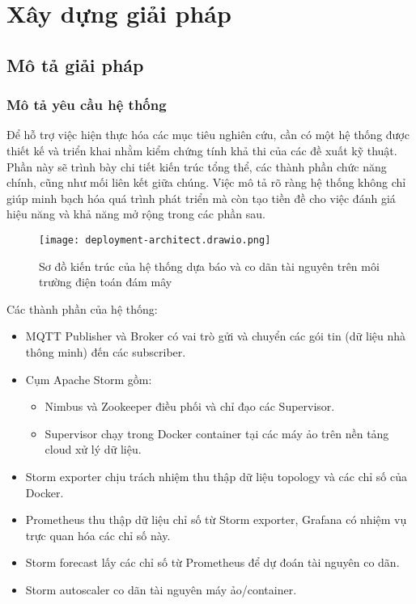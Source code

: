 \chapter{Xây dựng giải pháp \tenKL}

\section{Mô tả giải pháp}

\subsection{Mô tả yêu cầu hệ thống}

Để hỗ trợ việc hiện thực hóa các mục tiêu nghiên cứu, cần có một hệ thống được thiết kế và triển khai nhằm kiểm chứng tính khả thi của các đề xuất kỹ thuật. Phần này sẽ trình bày chi tiết kiến trúc tổng thể, các thành phần chức năng chính, cũng như mối liên kết giữa chúng. Việc mô tả rõ ràng hệ thống không chỉ giúp minh bạch hóa quá trình phát triển mà còn tạo tiền đề cho việc đánh giá hiệu năng và khả năng mở rộng trong các phần sau.

\begin{figure}[htbp]
    \centering
    \texttt{[image: deployment-architect.drawio.png]}
    \caption{Sơ đồ kiến trúc của hệ thống dựa báo và co dãn tài nguyên trên môi trường điện toán đám mây}
\end{figure}

Các thành phần của hệ thống:

\begin{itemize}
    \item MQTT Publisher và Broker có vai trò gửi và chuyển các gói tin (dữ liệu nhà thông minh) đến các subscriber.
    \item Cụm Apache Storm gồm:
          \begin{itemize}
              \item Nimbus và Zookeeper điều phối và chỉ đạo các Supervisor.
              \item Supervisor chạy trong Docker container tại các máy ảo trên nền tảng cloud xử lý dữ liệu.
          \end{itemize}
    \item Storm exporter chịu trách nhiệm thu thập dữ liệu topology và các chỉ số của Docker.
    \item Prometheus thu thập dữ liệu chỉ số từ Storm exporter, Grafana có nhiệm vụ trực quan hóa các chỉ số này.
    \item Storm forecast lấy các chỉ số từ Prometheus để dự đoán tài nguyên co dãn.
    \item Storm autoscaler co dãn tài nguyên máy ảo/container.
\end{itemize}

